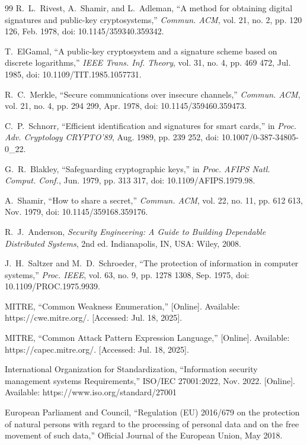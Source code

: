 \documentclass[12pt,twocolumn,journal]{IEEEtran}
\begin{document}
\begin{thebibliography}{99}
R.~L.~Rivest, A.~Shamir, and L.~Adleman, ``A method for obtaining digital signatures and public-key cryptosystems,'' \emph{Commun. ACM}, vol. 21, no. 2, pp. 120 126, Feb. 1978, doi: 10.1145/359340.359342.

T.~ElGamal, ``A public-key cryptosystem and a signature scheme based on discrete logarithms,'' \emph{IEEE Trans. Inf. Theory}, vol. 31, no. 4, pp. 469 472, Jul. 1985, doi: 10.1109/TIT.1985.1057731.

R.~C.~Merkle, ``Secure communications over insecure channels,'' \emph{Commun. ACM}, vol. 21, no. 4, pp. 294 299, Apr. 1978, doi: 10.1145/359460.359473.

C.~P.~Schnorr, ``Efficient identification and signatures for smart cards,'' in \emph{Proc. Adv. Cryptology CRYPTO'89}, Aug. 1989, pp. 239 252, doi: 10.1007/0-387-34805-0\_22.

G.~R.~Blakley, ``Safeguarding cryptographic keys,'' in \emph{Proc. AFIPS Natl. Comput. Conf.}, Jun. 1979, pp. 313 317, doi: 10.1109/AFIPS.1979.98.

A.~Shamir, ``How to share a secret,'' \emph{Commun. ACM}, vol. 22, no. 11, pp. 612 613, Nov. 1979, doi: 10.1145/359168.359176.

R.~J.~Anderson, \emph{Security Engineering: A Guide to Building Dependable Distributed Systems}, 2nd ed. Indianapolis, IN, USA: Wiley, 2008.

J.~H.~Saltzer and M.~D.~Schroeder, ``The protection of information in computer systems,'' \emph{Proc. IEEE}, vol. 63, no. 9, pp. 1278 1308, Sep. 1975, doi: 10.1109/PROC.1975.9939.

MITRE, ``Common Weakness Enumeration,'' [Online]. Available: https://cwe.mitre.org/. [Accessed: Jul. 18, 2025].

MITRE, ``Common Attack Pattern Expression Language,'' [Online]. Available: https://capec.mitre.org/. [Accessed: Jul. 18, 2025].

International Organization for Standardization, ``Information security management systems Requirements,'' ISO/IEC 27001:2022, Nov. 2022. [Online]. Available: https://www.iso.org/standard/27001

European Parliament and Council, ``Regulation (EU) 2016/679 on the protection of natural persons with regard to the processing of personal data and on the free movement of such data,'' Official Journal of the European Union, May 2018.


\end{thebibliography}
\end{document}
